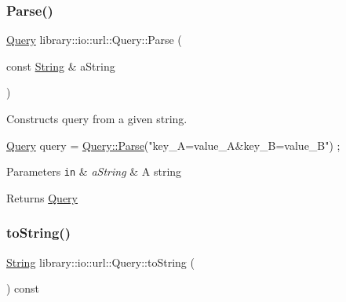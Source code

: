 \subsubsection{\texorpdfstring{Parse()}{Parse()}}
{\footnotesize\ttfamily \hyperlink{classlibrary_1_1io_1_1url_1_1_query}{Query} library\+::io\+::url\+::\+Query\+::\+Parse (\begin{DoxyParamCaption}\item[{const \hyperlink{namespacelibrary_1_1io_a7469b45835a4421045db344d6a5a1f85}{String} \&}]{a\+String }\end{DoxyParamCaption})\hspace{0.3cm}{\ttfamily [static]}}



Constructs query from a given string. 


\begin{DoxyCode}
\hyperlink{classlibrary_1_1io_1_1url_1_1_query_a6781de8f7b7251f8e17c191434b08039}{Query} query = \hyperlink{classlibrary_1_1io_1_1url_1_1_query_a52a7b884fbf52bb9bc449e5f314c3199}{Query::Parse}(\textcolor{stringliteral}{"key\_A=value\_A&key\_B=value\_B"}) ;
\end{DoxyCode}



\begin{DoxyParams}[1]{Parameters}
\mbox{\tt in}  & {\em a\+String} & A string \\
\hline
\end{DoxyParams}
\begin{DoxyReturn}{Returns}
\hyperlink{classlibrary_1_1io_1_1url_1_1_query}{Query} 
\end{DoxyReturn}
\mbox{\label{classlibrary_1_1io_1_1url_1_1_query_af38369d995520735ef60f28a949f1d6d}} 
\subsubsection{\texorpdfstring{to\+String()}{toString()}}
{\footnotesize\ttfamily \hyperlink{namespacelibrary_1_1io_a7469b45835a4421045db344d6a5a1f85}{String} library\+::io\+::url\+::\+Query\+::to\+String (\begin{DoxyParamCaption}{ }\end{DoxyParamCaption}) const}



